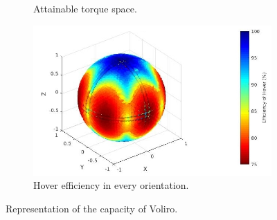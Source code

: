 \begin{figure}[!h]
{\begin{subfigure}[b]{0.5\textwidth}
    \caption{Attainable torque space.} \label{fig:voliro_tspace}
  \end{subfigure}
  \begin{subfigure}[b]{0.45\textwidth}
    \includegraphics[width=\linewidth]{images/Voliro_hspace.jpg}
    \caption{Hover efficiency in every orientation.} \label{fig:voliro_hspace}
  \end{subfigure}}
  \caption{Representation of the capacity of Voliro.}
  \label{fig:Voliro_spaces}
\end{figure}

\begin{table}[!h]
\begin{center}
 \caption{Comparison between the two designs' force capabilities.}\vspace{1ex}
 \label{tab:tab_Hexa_compare_force}
\end{center}
\end{table}

\begin{table}[!h]
\begin{center}
 \caption{Comparison between the two designs' torque capabilities.}\vspace{1ex}
 \label{tab:tab_Hexa_compare_torque}
\end{center}
\end{table}


